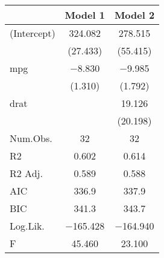 \begin{table}
\centering
\begin{tabular}[t]{lcc}
\toprule
  & Model 1 & Model 2\\
\midrule
(Intercept) & \num{324.082} & \num{278.515}\\
 & (\num{27.433}) & (\num{55.415})\\
mpg & \num{-8.830} & \num{-9.985}\\
 & (\num{1.310}) & (\num{1.792})\\
drat &  & \num{19.126}\\
 &  & (\num{20.198})\\
\midrule
Num.Obs. & \num{32} & \num{32}\\
R2 & \num{0.602} & \num{0.614}\\
R2 Adj. & \num{0.589} & \num{0.588}\\
AIC & \num{336.9} & \num{337.9}\\
BIC & \num{341.3} & \num{343.7}\\
Log.Lik. & \num{-165.428} & \num{-164.940}\\
F & \num{45.460} & \num{23.100}\\
\bottomrule
\end{tabular}
\end{table}
